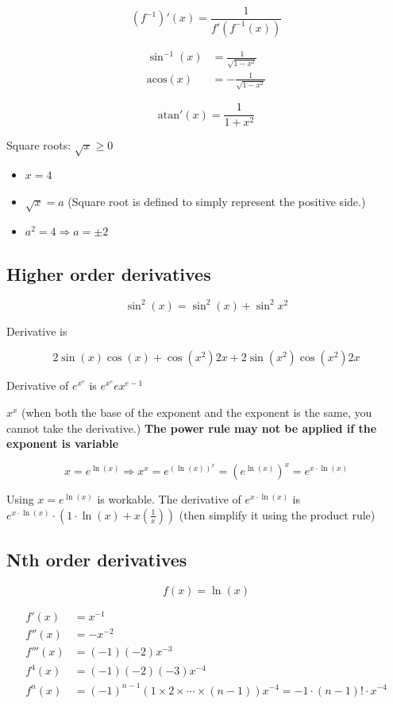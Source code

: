 \documentclass[12pt]{article}
\theoremstyle{plain}
\theoremstyle{remark}
\theoremstyle{definition}
\begin{document}
\[\left( f^{- 1} \right)'(x) = \frac{1}{f'\left( f^{- 1}(x) \right)}\]

\begin{align*}
\sin^{- 1}{(x)} &= \frac{1}{\sqrt{1 - x^{2}}} \\
\text{acos}(x) &= - \frac{1}{\sqrt{1 - x^{2}}}
\end{align*}


\[\text{atan}'(x) = \frac{1}{1 + x^{2}}\]

Square roots: \(\sqrt{x} \geq 0\)

\begin{itemize}
\item
  \(x = 4\)
\item
  \(\sqrt{x} = a\) (Square root is defined to simply represent the
  positive side.)
\item
  \(a^{2} = 4 \Rightarrow a = \pm 2\)
\end{itemize}


\subsection{Higher order derivatives}

\[\sin^{2}{(x)} = \sin^{2}(x) + \sin^{2}x^{2}\]

Derivative is

\[2\sin(x)\cos(x) + \cos\left( x^{2} \right)2x + 2\sin\left( x^{2} \right)\cos\left( x^{2} \right)2x\]

Derivative of \(e^{x^{e}}\) is \(e^{x^{e}}ex^{e - 1}\)

\(x^{x}\) (when both the base of the exponent and the exponent is the
same, you cannot take the derivative.) \textbf{The power rule may not be
applied if the exponent is variable}

\[x = e^{\ln(x)} \Rightarrow x^{x} = e^{\left( \ln(x) \right)^{x}} = \left( e^{\ln(x)} \right)^{x} = e^{x \cdot \ln(x)}\]

Using \(x = e^{\ln(x)}\) is workable. The derivative of
\(e^{x \cdot \ln(x)}\) is
\(e^{x \cdot \ln(x)} \cdot \left( 1 \cdot \ln(x) + x\left( \frac{1}{x} \right) \right)\)
(then simplify it using the product rule)


\subsection{Nth order derivatives}

\[f(x) = \ln(x)\]

\begin{align*}
f'(x) &= x^{- 1} \\
f''(x) &= - x^{- 2} \\
f'''(x) &= ( - 1)( - 2)x^{- 3} \\
f^{4}(x) &= ( - 1)( - 2)( - 3)x^{- 4} \\
f^{n}(x) &= ( - 1)^{n - 1}\left( 1 \times 2 \times \cdots \times (n - 1) \right)x^{- 4} = - 1 \cdot (n - 1)! \cdot x^{- 4}
\end{align*}
\end{document}
